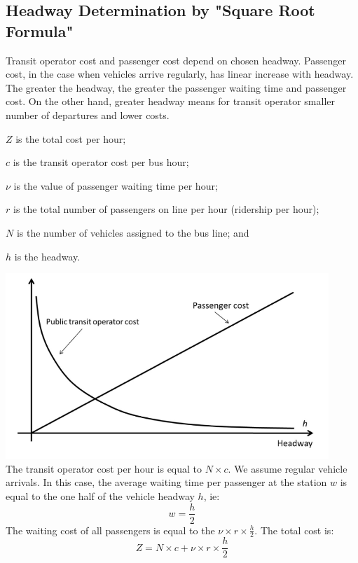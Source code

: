 \subsection{Headway Determination by "Square Root Formula" }
Transit operator cost and passenger cost depend on chosen headway. Passenger cost, in the case when vehicles arrive regularly, has linear increase with headway. The greater the headway, the greater the passenger waiting time and passenger cost. On the other hand, greater headway means for transit operator smaller number of departures and lower costs.
\begin{description}
	\item $ Z $ is the total cost per hour;
	\item $ c $ is the transit operator cost per bus hour;
	\item $\nu$ is the value of passenger waiting time per hour;
	\item $ r $ is the total number of passengers on line per hour (ridership per hour);
	\item $ N $ is the number of vehicles assigned to the bus line; and
	\item $ h $ is the headway.
\end{description}
\includegraphics{gfx/fig25.png}\\
The transit operator cost per hour is equal to $N \times c$. We assume regular vehicle arrivals. In this case, the average waiting time per passenger at the station $ w $ is equal to the one half of the vehicle headway $ h $, ie:
\begin{equation}
	w = \frac{h}{2}
\end{equation}
The waiting cost of all passengers is equal to the $ \nu \times r \times \frac{h}{2} $. The total cost is:
\begin{equation}
	Z = N \times c + \nu \times r \times \frac{h}{2}
\end{equation}
